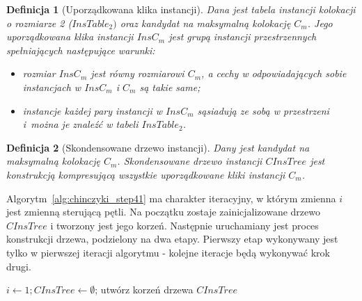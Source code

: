 \documentclass[12pt]{article}
\newtheorem{defin}{Definicja}
\begin{document}
\begin{defin}[Uporządkowana klika instancji]
Dana jest tabela instancji kolokacji o rozmiarze 2 ($ InsTable_{2}) $ oraz kandydat na maksymalną kolokację $ C_{m} $. Jego uporządkowana klika instancji $ InsC_{m} $ jest grupą instancji przestrzennych spełniających następujące warunki:
\begin{itemize}
\item rozmiar $ InsC_{m} $ jest równy rozmiarowi $ C_{m} $, a cechy w odpowiadających sobie instancjach w $ InsC_{m} $ i $ C_{m} $ są takie same; 
\item instancje każdej pary instancji w $ InsC_{m} $ sąsiadują ze sobą w przestrzeni i~można je znaleźć w tabeli  $ InsTable_{2} $.
\end{itemize}
\end{defin}

\begin{defin}[Skondensowane drzewo instancji]Dany jest kandydat na maksymalną kolokację $ C_{m} $. Skondensowane drzewo instancji $ CInsTree$ jest konstrukcją kompresującą wszystkie uporządkowane kliki instancji $ C_{m} $.
\label{def:condensed}
\end{defin}

Algorytm~\ref{alg:chinczyki_step41} ma charakter iteracyjny, w którym zmienna $ i $ jest zmienną sterującą pętli. Na początku zostaje zainicjalizowane drzewo $ CInsTree $ i tworzony jest jego korzeń. Następnie uruchamiany jest proces konstrukcji drzewa, podzielony na dwa etapy. Pierwszy etap wykonywany jest tylko w pierwszej iteracji algorytmu - kolejne iteracje będą wykonywać krok drugi. 

\begin{algorithm}
$ i \leftarrow 1; CInsTree \leftarrow \emptyset$; utwórz korzeń drzewa $ CInsTree $\;
\caption{Konstrukcja skondensowanego drzewa instancji $ C_{m} $}
\label{alg:chinczyki_step41}
\end{algorithm}
\end{document}
